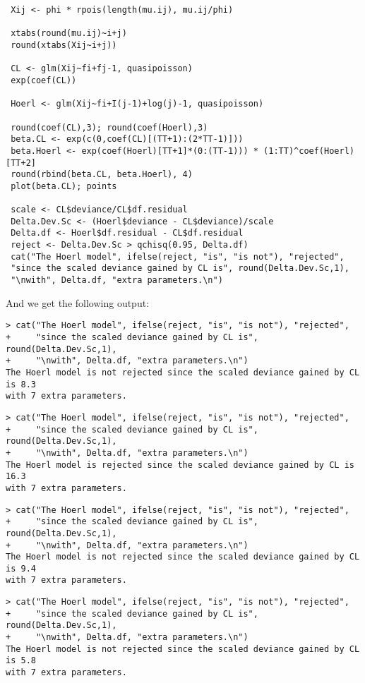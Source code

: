 \documentclass[11pt]{article}
\begin{document}
\begin{verbatim}
 Xij <- phi * rpois(length(mu.ij), mu.ij/phi)
 
 xtabs(round(mu.ij)~i+j)
 round(xtabs(Xij~i+j))

 CL <- glm(Xij~fi+fj-1, quasipoisson)
 exp(coef(CL))
 
 Hoerl <- glm(Xij~fi+I(j-1)+log(j)-1, quasipoisson)
 
 round(coef(CL),3); round(coef(Hoerl),3)
 beta.CL <- exp(c(0,coef(CL)[(TT+1):(2*TT-1)]))
 beta.Hoerl <- exp(coef(Hoerl)[TT+1]*(0:(TT-1))) * (1:TT)^coef(Hoerl)[TT+2]
 round(rbind(beta.CL, beta.Hoerl), 4)
 plot(beta.CL); points
 
 scale <- CL$deviance/CL$df.residual
 Delta.Dev.Sc <- (Hoerl$deviance - CL$deviance)/scale
 Delta.df <- Hoerl$df.residual - CL$df.residual
 reject <- Delta.Dev.Sc > qchisq(0.95, Delta.df)
 cat("The Hoerl model", ifelse(reject, "is", "is not"), "rejected",
 "since the scaled deviance gained by CL is", round(Delta.Dev.Sc,1),
 "\nwith", Delta.df, "extra parameters.\n")
\end{verbatim}

And we get the following output:
\begin{verbatim}
> cat("The Hoerl model", ifelse(reject, "is", "is not"), "rejected",
+     "since the scaled deviance gained by CL is", round(Delta.Dev.Sc,1),
+     "\nwith", Delta.df, "extra parameters.\n")
The Hoerl model is not rejected since the scaled deviance gained by CL is 8.3 
with 7 extra parameters.
\end{verbatim}

\begin{verbatim}
> cat("The Hoerl model", ifelse(reject, "is", "is not"), "rejected",
+     "since the scaled deviance gained by CL is", round(Delta.Dev.Sc,1),
+     "\nwith", Delta.df, "extra parameters.\n")
The Hoerl model is rejected since the scaled deviance gained by CL is 16.3 
with 7 extra parameters.
\end{verbatim}

\begin{verbatim}
> cat("The Hoerl model", ifelse(reject, "is", "is not"), "rejected",
+     "since the scaled deviance gained by CL is", round(Delta.Dev.Sc,1),
+     "\nwith", Delta.df, "extra parameters.\n")
The Hoerl model is not rejected since the scaled deviance gained by CL is 9.4 
with 7 extra parameters.
\end{verbatim}

\begin{verbatim}
> cat("The Hoerl model", ifelse(reject, "is", "is not"), "rejected",
+     "since the scaled deviance gained by CL is", round(Delta.Dev.Sc,1),
+     "\nwith", Delta.df, "extra parameters.\n")
The Hoerl model is not rejected since the scaled deviance gained by CL is 5.8 
with 7 extra parameters.
\end{verbatim}
\end{document}
